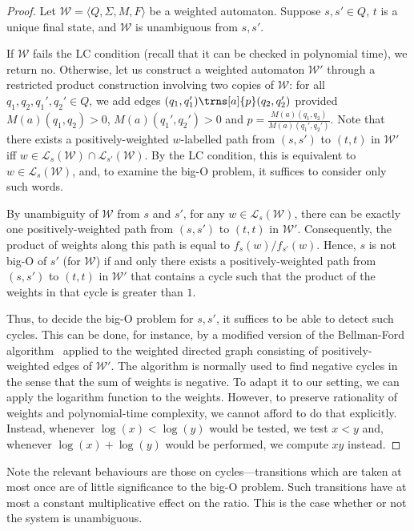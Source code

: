 \documentclass{lmcs}
\theoremstyle{plain}
\theoremstyle{definition}
\theoremstyle{remark}
\newcommand\abra[1]{\langle #1 \rangle}
\newcommand\lng[2]{\mathcal{L}_{#1}(#2)}
\newcommand\wa{\mathcal{W}}
\renewcommand\nu{f}
\begin{document}
\begin{proof}
Let $\wa=\abra{Q, \Sigma{}, M, F}$ be a weighted automaton.
Suppose $s,s'\in Q$, $t$ is a unique final state, and $\wa$ is unambiguous from $s, s'$.

If $\wa$ fails the LC condition (recall that it can be checked in polynomial time), we return {no}. Otherwise,
let us construct a weighted automaton  $\wa'$  through a restricted product construction involving two copies of $\wa$:
for all $q_1, q_2, q_1', q_2'\in Q$, we add edges $(q_1,q_1') \trns[a]{p} (q_2,q_2')$ provided
$M(a)(q_1,q_2)>0$, $M(a)(q_1',q_2')>0$ and $p=\frac{M(a)(q_1,q_2)}{M(a)(q_1',q_2')}$.
Note that there exists a positively-weighted $w$-labelled path from $(s,s')$ to $(t,t)$ in $\wa'$
iff $w\in \lng{s}{\wa}\cap \lng{s'}{\wa}$. By the LC condition, this is equivalent to $w\in \lng{s}{\wa}$,
and, to examine the big-O problem, it suffices to consider only such words.

By unambiguity of $\wa$ from $s$ and $s'$, for any $w\in  \lng{s}{\wa}$, there can be exactly one positively-weighted path from $(s,s')$ to $(t,t)$ in $\wa'$.
Consequently, the product of weights along this path is equal to $\nu_s(w)/\nu_{s'}(w)$.
Hence,  $s$ is not big-O of $s'$ (for $\wa$) if and only there exists a positively-weighted path from $(s,s')$ to $(t,t)$ in $\wa'$
that contains a cycle such that the product of the weights in that cycle is greater than $1$.

Thus, to decide the big-O problem for $s,s'$, it suffices to be able to detect such cycles.
This can be done, for instance, by a modified version of
the Bellman-Ford algorithm~\cite{CLR90} applied to the weighted directed graph consisting of positively-weighted edges of $\wa'$.
The algorithm is normally used to find negative cycles in the sense that the sum of weights is negative.
To adapt it to our setting, we can apply the logarithm function to the weights.
However, to preserve rationality of weights and polynomial-time complexity,
we cannot afford to do that explicitly. Instead, whenever $\log(x)<\log(y)$ would be tested, we test $x<y$ and, whenever $\log(x)+\log(y)$ would be performed,
we compute $xy$ instead.
\end{proof}

Note the relevant behaviours are those on cycles---transitions which are taken at most once are of little significance to the big-O problem.
Such transitions have at most a constant multiplicative effect on the ratio. This is the case whether or not the system is unambiguous.
\end{document}
